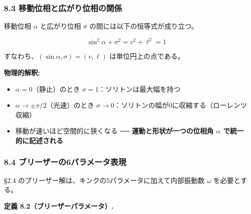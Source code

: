 \documentclass[a4paper,11pt]{ltjsarticle}
\providecommand{\tightlist}{\setlength{\itemsep}{0pt}\setlength{\parskip}{0pt}}
\begin{document}
\subsubsection{8.3
移動位相と広がり位相の関係}\label{ux79fbux52d5ux4f4dux76f8ux3068ux5e83ux304cux308aux4f4dux76f8ux306eux95a2ux4fc2}

移動位相 \(\alpha\) と広がり位相 \(\sigma\)
の間には以下の恒等式が成り立つ。

\[\sin^2\alpha + \sigma^2 = v^2 + \ell^2 = 1\]

すなわち、\((\sin\alpha, \sigma) = (v, \ell)\) は単位円上の点である。

\textbf{物理的解釈:}

\begin{itemize}
\tightlist
\item
  \(\alpha = 0\)（静止）のとき \(\sigma = 1\)：ソリトンは最大幅を持つ
\item
  \(\alpha \to \pm\pi/2\)（光速）のとき
  \(\sigma \to 0\)：ソリトンの幅が0に収縮する（ローレンツ収縮）
\item
  移動が速いほど空間的に狭くなる ── \textbf{運動と形状が一つの位相角
  \(\alpha\) で統一的に記述される}
\end{itemize}

\subsubsection{8.4
ブリーザーの6パラメータ表現}\label{ux30d6ux30eaux30fcux30b6ux30fcux306e6ux30d1ux30e9ux30e1ux30fcux30bfux8868ux73fe}

§2.4 のブリーザー解は、キンクの5パラメータに加えて内部振動数 \(\omega\)
を必要とする。

\textbf{定義 8.2（ブリーザーパラメータ）.}
\end{document}
